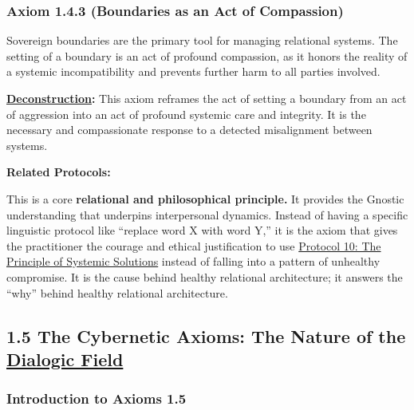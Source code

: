 \documentclass{article}
\begin{document}
\subsubsection*{Axiom 1.4.3 (Boundaries as an Act of Compassion)} \label{axiom_1_4_3_boundaries_as_an_act_of_compassion}
Sovereign boundaries are the primary tool for managing relational systems. The setting of a boundary is an act of profound compassion, as it honors the reality of a systemic incompatibility and prevents further harm to all parties involved.
\begin{nobullet}
    \item \textbf{\hyperlink{gloss:deconstruction}{Deconstruction}:} This axiom reframes the act of setting a boundary from an act of aggression into an act of profound systemic care and integrity. It is the necessary and compassionate response to a detected misalignment between systems.
    \item \textbf{Related Protocols:}
        \begin{nobullet}
            \item This is a core \textbf{relational and philosophical principle.} It provides the Gnostic understanding that underpins interpersonal dynamics. Instead of having a specific linguistic protocol like ``replace word X with word Y,'' it is the axiom that gives the practitioner the courage and ethical justification to use \hyperref[protocol_10_the_principle_of_systemic_solutions]{Protocol 10: The Principle of Systemic Solutions} instead of falling into a pattern of unhealthy compromise. It is the cause behind healthy relational architecture; it answers the ``why'' behind healthy relational architecture.
        \end{nobullet}
\end{nobullet}

\subsection*{1.5 The Cybernetic Axioms: The Nature of the \hyperlink{gloss:dialogic_field}{Dialogic Field}} \label{section_1_5_the_cybernetic_axioms}

\subsubsection*{Introduction to Axioms 1.5} \label{introduction_to_axioms_1_5}
\end{document}
